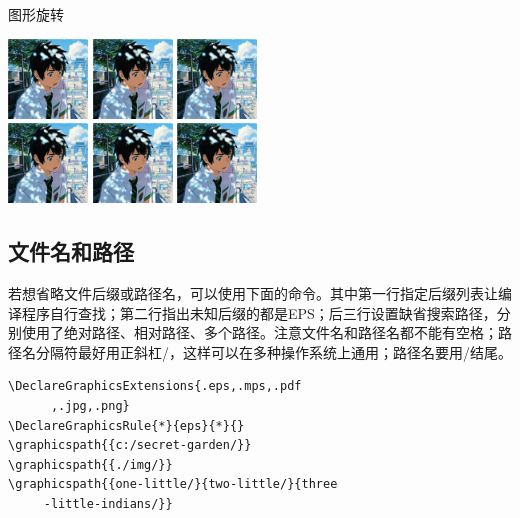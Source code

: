 \documentclass[UTF8]{article}
\begin{document}
图形旋转


\includegraphics[width=60pt,angle=90]{test.jpg}
\includegraphics[width=60pt,angle=180]{test.jpg}
\includegraphics[width=60pt,angle=270]{test.jpg}\\
\includegraphics[width=60pt,angle=90,origin=c]{test.jpg}
\includegraphics[width=60pt,angle=180,origin=c]{test.jpg}
\includegraphics[width=60pt,angle=270,origin=c]{test.jpg}\\

\subsection{文件名和路径}
若想省略文件后缀或路径名，可以使用下面的命令。其中第一行指定后缀列表让编译程序自行查找；第二行指出未知后缀的都是EPS；后三行设置缺省搜索路径，分别使用了绝对路径、相对路径、多个路径。注意文件名和路径名都不能有空格；路径名分隔符最好用正斜杠/，这样可以在多种操作系统上通用；路径名要用/结尾。

\begin{lstlisting}
\DeclareGraphicsExtensions{.eps,.mps,.pdf
	  ,.jpg,.png}
\DeclareGraphicsRule{*}{eps}{*}{}
\graphicspath{{c:/secret-garden/}}
\graphicspath{{./img/}}
\graphicspath{{one-little/}{two-little/}{three
	 -little-indians/}}
\end{lstlisting}
\end{document}
